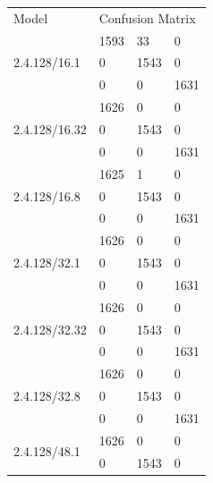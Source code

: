 \documentclass[12pt]{article}
\begin{document}
\begin{longtable}{llll}
Model                    & \multicolumn{3}{l}{Confusion Matrix} \\
\multirow{3}{*}{2.4.128/16.1}   &  1593 & 33 & 0 \\
                                                                            &  0 & 1543 & 0 \\
                                                                            &  0 & 0 & 1631 \\ \hline
\multirow{3}{*}{2.4.128/16.32}   &  1626 & 0 & 0 \\
                                                                            &  0 & 1543 & 0 \\
                                                                            &  0 & 0 & 1631 \\ \hline
\multirow{3}{*}{2.4.128/16.8}   &  1625 & 1 & 0 \\
                                                                            &  0 & 1543 & 0 \\
                                                                            &  0 & 0 & 1631 \\ \hline
\multirow{3}{*}{2.4.128/32.1}   &  1626 & 0 & 0 \\
                                                                            &  0 & 1543 & 0 \\
                                                                            &  0 & 0 & 1631 \\ \hline
\multirow{3}{*}{2.4.128/32.32}   &  1626 & 0 & 0 \\
                                                                            &  0 & 1543 & 0 \\
                                                                            &  0 & 0 & 1631 \\ \hline
\multirow{3}{*}{2.4.128/32.8}   &  1626 & 0 & 0 \\
                                                                            &  0 & 1543 & 0 \\
                                                                            &  0 & 0 & 1631 \\ \hline
\multirow{3}{*}{2.4.128/48.1}   &  1626 & 0 & 0 \\
                                                                            &  0 & 1543 & 0 \\

\end{longtable}
\end{document}
